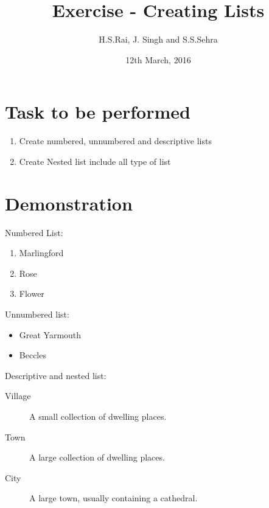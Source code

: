 \documentclass[12pt]{article}
\title{Exercise  - Creating Lists }
\author{H.S.Rai, J. Singh and S.S.Sehra}
\date{12th March, 2016}
\begin{document}
	\maketitle
	\section*{Task to be performed}
	\begin{enumerate}
		\item Create numbered, unnumbered and descriptive lists
		\item Create Nested list include all type of list
	\end{enumerate}
\section*{Demonstration}	
Numbered List:
	
\begin{enumerate}

	   	
\item Marlingford
   	
\item Rose
\item Flower
	   	
\end{enumerate}

Unnumbered list:
\begin{itemize}
\item Great Yarmouth
\item Beccles
\end{itemize}

Descriptive and nested list:
\begin{description}

  \item[Village] A small collection of dwelling places. 
   \item[Town] A large collection of dwelling places.    
  \item[City] A large town, usually containing a cathedral.  
\end{description}
\end{document}
